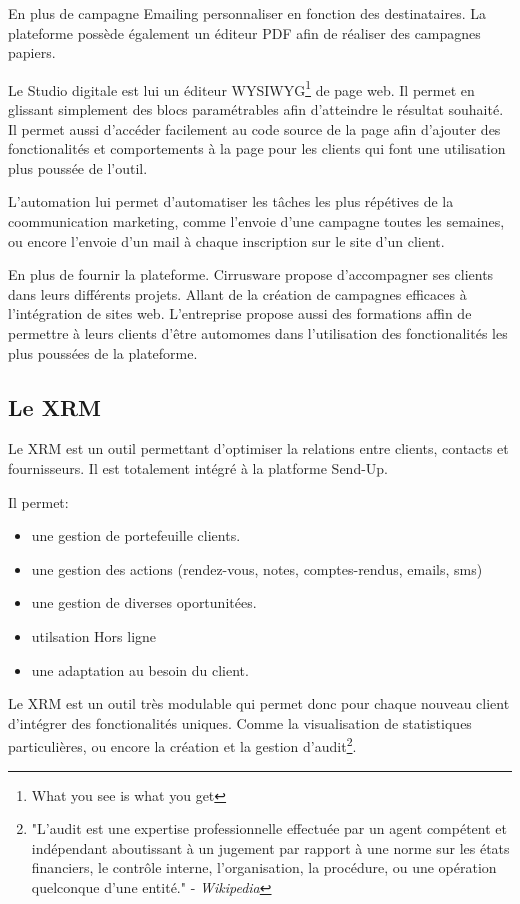En plus de campagne Emailing personnaliser en fonction des destinataires. La plateforme possède également un éditeur PDF afin de réaliser des campagnes papiers. 

Le Studio digitale est lui un éditeur WYSIWYG\footnote{What you see is what you get} de page web. Il permet en glissant simplement des blocs paramétrables afin d'atteindre le résultat souhaité. Il permet aussi d'accéder facilement au code source de la page afin d'ajouter des fonctionalités et comportements à la page pour les clients qui font une utilisation plus poussée de l'outil.

L'automation lui permet d'automatiser les tâches les plus répétives de la coommunication marketing, comme l'envoie d'une campagne toutes les semaines, ou encore l'envoie d'un mail à chaque inscription sur le site d'un client. 

En plus de fournir la plateforme. Cirrusware propose d'accompagner ses clients dans leurs différents projets. Allant de la création de campagnes efficaces à l'intégration de sites web. L'entreprise propose aussi des formations affin de permettre à leurs clients d'être automomes dans l'utilisation des fonctionalités les plus poussées de la plateforme.

\subsection{Le XRM}
Le XRM est un outil permettant d'optimiser la relations entre clients, contacts et fournisseurs. Il est totalement intégré à la platforme Send-Up.

Il permet: 
\begin{itemize}
    \item une gestion de portefeuille clients. 
    \item une gestion des actions (rendez-vous, notes, comptes-rendus, emails, sms)
    \item une gestion de diverses oportunitées. 
    \item utilsation Hors ligne
    \item une adaptation au besoin du client. 
\end{itemize}

Le XRM est un outil très modulable qui permet donc pour chaque nouveau client d'intégrer des fonctionalités uniques. Comme la visualisation de statistiques particulières, ou encore la création et la gestion d'audit\footnote{"L’audit est une expertise professionnelle effectuée par un agent compétent et indépendant aboutissant à un jugement par rapport à une norme sur les états financiers, le contrôle interne, l'organisation, la procédure, ou une opération quelconque d'une entité." - \textit{Wikipedia}\cite{audit}}. 

